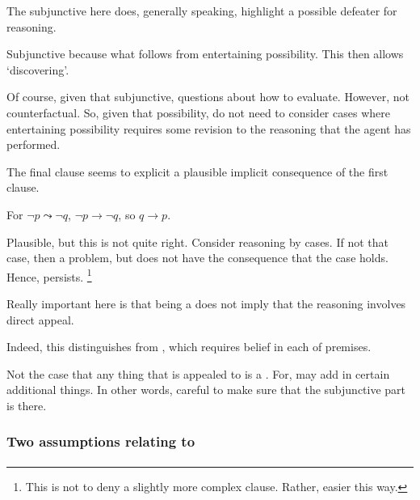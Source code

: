 \begin{note}
  The subjunctive here does, generally speaking, highlight a possible defeater for reasoning.

  Subjunctive because what follows from entertaining possibility.
  This then allows `discovering'.

  Of course, given that subjunctive, questions about how to evaluate.
  However, not counterfactual.
  So, given that possibility, do not need to consider cases where entertaining possibility requires some revision to the reasoning that the agent has performed.

  The final clause seems to explicit a plausible implicit consequence of the first clause.

  For \(\lnot p \leadsto \lnot q\), \(\lnot p \rightarrow \lnot q\), so \(q \rightarrow p\).

  Plausible, but this is not quite right.
  Consider reasoning by cases.
  If not that case, then a problem, but does not have the consequence that the case holds.
  Hence, persists.\nolinebreak
  \footnote{
    This is not to deny a slightly more complex clause.
    Rather, easier this way.
  }
\end{note}

\begin{note}
  Really important here is that being a \requ{} does not imply that the reasoning involves direct appeal.

  {
    \color{red}
    Indeed, this distinguishes from \citeauthor{Sgaravatti:2013wu}, which requires belief in each of premises.
  }
\end{note}

\begin{note}
  Not the case that any thing that is appealed to is a \requ{}.
  For, may add in certain additional things.
  In other words, careful to make sure that the subjunctive part is there.
\end{note}

\subsubsection{Two assumptions relating to }
\label{sec:two-assumpt-relat-to-requ}

\paragraph{\ideaCSA{}}


